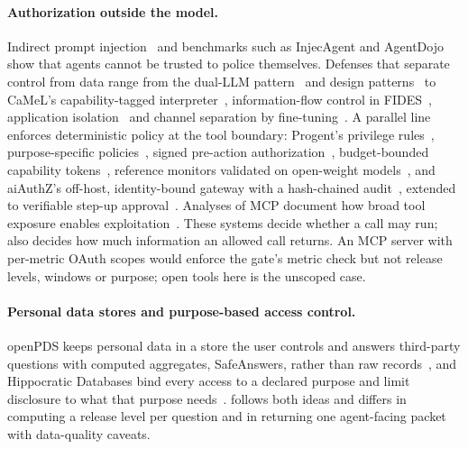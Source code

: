 \paragraph{Authorization outside the model.} Indirect prompt injection~\citep{greshake2023indirect} and benchmarks
such as InjecAgent and AgentDojo~\citep{zhan2024injecagent,debenedetti2024agentdojo} show that agents cannot be
trusted to police themselves. Defenses that separate control from data range from the dual-LLM
pattern~\citep{willison2023dual} and design patterns~\citep{beurerkellner2025patterns} to CaMeL's capability-tagged
interpreter~\citep{debenedetti2025camel}, information-flow control in FIDES~\citep{costa2025fides}, application
isolation~\citep{wu2025isolategpt} and channel separation by fine-tuning~\citep{chen2025struq}. A parallel line
enforces deterministic policy at the tool boundary: Progent's privilege rules~\citep{shi2025progent},
purpose-specific policies~\citep{tsai2025conseca}, signed pre-action authorization~\citep{uchibeke2026oap},
budget-bounded capability tokens~\citep{suresh2026agentcap}, reference monitors validated on open-weight
models~\citep{aljumaily2026untrusted}, and aiAuthZ's off-host, identity-bound gateway with a hash-chained
audit~\citep{kodathala2026aiauthz}, extended to verifiable step-up approval~\citep{kodathala2026stepup}. Analyses of
MCP document how broad tool exposure enables exploitation~\citep{hou2025mcp,radosevich2025mcpaudit,hasan2025mcp}.
These systems decide whether a call may run; \sys{} also decides how much information an allowed call returns. An MCP
server with per-metric OAuth scopes would enforce the gate's metric check but not release levels, windows or purpose;
open tools here is the unscoped case.

\paragraph{Personal data stores and purpose-based access control.} openPDS keeps personal data in a store the user
controls and answers third-party questions with computed aggregates, SafeAnswers, rather than raw
records~\citep{demontjoye2014openpds}, and Hippocratic Databases bind every access to a declared purpose and limit
disclosure to what that purpose needs~\citep{agrawal2002hippocratic}. \sys{} follows both ideas and differs in
computing a release level per question and in returning one agent-facing packet with data-quality caveats.

